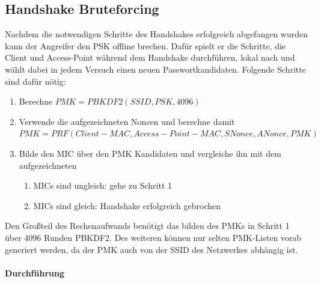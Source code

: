 \subsection{Handshake Bruteforcing}
Nachdem die notwendigen Schritte des Handshakes erfolgreich abgefangen wurden kann der Angreifer den PSK offline brechen.
Dafür spielt er die Schritte, die Client und Access-Point während dem Handshake durchführen, lokal nach und wählt dabei in jedem Versuch einen neuen Passwortkandidaten.
Folgende Schritte sind dafür nötig:
\begin{enumerate}
	\item Berechne $PMK = PBKDF2(SSID, PSK, 4096)$
	\item Verwende die aufgezeichneten Noncen und berechne damit \\$PMK = PRF(Client-MAC, Access-Point-MAC, SNonce, ANonce, PMK)$
	\item Bilde den MIC über den PMK Kandidaten und vergleiche ihn mit dem aufgezeichneten
	\begin{enumerate}
		\item MICs sind ungleich: gehe zu Schritt 1
		\item MICs sind gleich: Handshake erfolgreich gebrochen
	\end{enumerate}
\end{enumerate}
Den Großteil des Rechenaufwands benötigt das bilden des PMKs in Schritt 1 über 4096 Runden PBKDF2.
Des weiteren können nur selten PMK-Listen vorab generiert werden, da der PMK auch von der SSID des Netzwerkes abhängig ist.

\paragraph{Durchführung}

